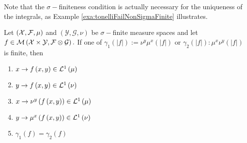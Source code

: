 Note that the $\sigma-$finiteness condition is actually necessary
for the uniqueness of the integrals, as Example \ref{exa:tonelliFailNonSigmaFinite}
illustrates.
\begin{cor}
Let $\left(\mathcal{X},\mathcal{F},\mu\right)$ and $\left(\mathcal{Y},\mathcal{G},\nu\right)$
be $\sigma-$finite measure spaces and let $f\in\mathcal{M}\left(\mathcal{X}\times\mathcal{Y},\mathcal{F}\otimes\mathcal{G}\right).$
If one of $\gamma_{1}\left(\lvert f\rvert\right):=\nu^{y}\mu^{x}\left(\lvert f\rvert\right)$
or $\gamma_{2}\left(\lvert f\rvert\right):\mu^{x}\nu^{y}\left(\lvert f\rvert\right)$
is finite, then

\begin{enumerate}[label=(\roman*),leftmargin=.1\linewidth,rightmargin=.4\linewidth]
\item $x \to f\left(x,y\right) \in \mathcal{L}^{1}\left(\mu\right)$
\item $y \to f\left(x,y\right) \in \mathcal{L}^{1}\left(\nu\right)$
\item $x \to \nu^y\left(f\left(x,y\right)\right)\in \mathcal{L}^{1}\left(\mu\right)$
\item $y \to \mu^x\left(f\left(x,y\right)\right) \in \mathcal{L}^{1}\left(\nu\right)$
\item $\gamma_1\left(f\right) = \gamma_2\left(f\right)$
\end{enumerate}
\end{cor}

